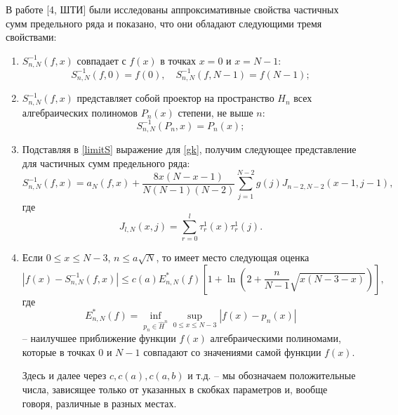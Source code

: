 \documentclass[12pt]{book}
\begin{document}
В работе [4, ШТИ] были исследованы аппроксимативные свойства частичных сумм предельного ряда и показано, что они обладают следующими тремя свойствами:
\begin{enumerate}
  \item $S_{n,N}^{-1}(f,x)$ совпадает с $f(x)$ в точках $x=0$ и $x=N-1$:%
    \begin{equation}\label{limprop1}
        S_{n,N}^{-1}(f,0) = f(0), \quad S_{n,N}^{-1}(f,N-1)=f(N-1);
    \end{equation}
  \item $S_{n,N}^{-1}(f,x)$ представляет собой проектор на пространство $H_n$ всех алгебраических полиномов $P_n(x)$ степени, не выше $n$:%
    \begin{equation}\label{limprop2}
        S_{n,N}^{-1}(P_n,x) = P_n(x);
    \end{equation}
  \item Подставляя в \eqref{limitS} выражение для \eqref{gk}, получим следующее представление для частичных сумм предельного ряда:
    \begin{equation}
    \label{Sn_jay}
     S_{n,N}^{-1}(f,x) =
     a_N(f,x) + \frac{8x(N-x-1)}{N(N-1)(N-2)} \sum\limits_{j=1}^{N-2} g(j) J_{n-2,N-2}(x-1,j-1) ,
    \end{equation}
    где
    \begin{equation}\label{Jay}
      J_{l,N}(x,j) = \sum_{r=0}^{l} \tau^{1}_{r}(x) \tau^{1}_{r}(j).
    \end{equation}

  \item Если $0\le x\le N-3$, $n\le a\sqrt{N}$, то имеет место следующая оценка
    \begin{equation}\label{applimitR}
        |f(x)-S_{n,N}^{-1}(f,x)|\le c(a)E_{n,N}^{*}(f)\left[1+\ln\left(2+\frac{n}{N-1}\sqrt{x(N-3-x)}\right)\right],
    \end{equation}
    где
    $$E_{n,N}^{*}(f) = \inf_{p_n \in \hat{H}^n} \sup_{0\le x\le N-3} |f(x)-p_n(x)|$$
    -- наилучшее приближение функции $f(x)$ алгебраическими полиномами, которые в точках $0$ и $N-1$ совпадают со значениями самой функции $f(x)$.

    Здесь и далее через $c, c(a), c(a,b)$ и т.д. -- мы обозначаем положительные числа, зависящее только от указанных в скобках параметров и, вообще говоря, различные в разных местах.
\end{enumerate}
\end{document}
